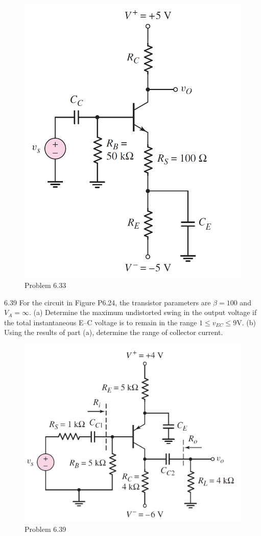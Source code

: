 \documentclass[a4paper,11pt,UTF8]{article}
\begin{document}
\begin{figure}[H] 
	\centering 
	\includegraphics[scale=0.3]{MD6.33.png}
	\caption{Problem 6.33}
\end{figure}
6.39 For the circuit in Figure P6.24, the transistor parameters are $\beta = 100$ and
$V_A =\infty$. (a) Determine the maximum undistorted swing in the output
voltage if the total instantaneous E–C voltage is to remain in the range
$1 \leq v_{EC} \leq 9 $V. (b) Using the results of part (a), determine the range of collector
current.
\begin{figure}[H] 
	\centering 
	\includegraphics[scale=0.3]{MD6.39.png}
	\caption{Problem 6.39}
\end{figure}
\end{document}
